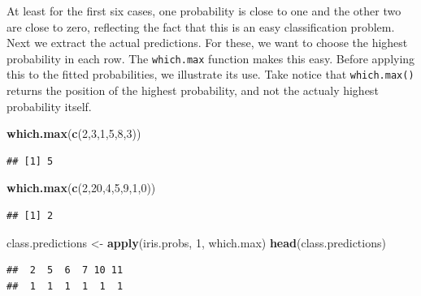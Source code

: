 \documentclass[
]{krantz}
\newenvironment{Shaded}{\begin{snugshade}}{\end{snugshade}}
\newcommand{\DecValTok}[1]{\textcolor[rgb]{0.00,0.00,0.81}{#1}}
\newcommand{\KeywordTok}[1]{\textcolor[rgb]{0.13,0.29,0.53}{\textbf{#1}}}
\newcommand{\NormalTok}[1]{#1}
\newcommand{\StringTok}[1]{\textcolor[rgb]{0.31,0.60,0.02}{#1}}
\begin{document}
At least for the first six cases, one probability is close to one and the other two are close to zero, reflecting the fact that this is an easy classification problem. Next we extract the actual predictions. For these, we want to choose the highest probability in each row. The \texttt{which.max} function makes this easy. Before applying this to the fitted probabilities, we illustrate its use. Take notice that \texttt{which.max()} returns the position of the highest probability, and not the actualy highest probability itself.

\begin{Shaded}
\begin{Highlighting}[]
\KeywordTok{which.max}\NormalTok{(}\KeywordTok{c}\NormalTok{(}\DecValTok{2}\NormalTok{,}\DecValTok{3}\NormalTok{,}\DecValTok{1}\NormalTok{,}\DecValTok{5}\NormalTok{,}\DecValTok{8}\NormalTok{,}\DecValTok{3}\NormalTok{))}
\end{Highlighting}
\end{Shaded}

\begin{verbatim}
## [1] 5
\end{verbatim}

\begin{Shaded}
\begin{Highlighting}[]
\KeywordTok{which.max}\NormalTok{(}\KeywordTok{c}\NormalTok{(}\DecValTok{2}\NormalTok{,}\DecValTok{20}\NormalTok{,}\DecValTok{4}\NormalTok{,}\DecValTok{5}\NormalTok{,}\DecValTok{9}\NormalTok{,}\DecValTok{1}\NormalTok{,}\DecValTok{0}\NormalTok{))}
\end{Highlighting}
\end{Shaded}

\begin{verbatim}
## [1] 2
\end{verbatim}

\begin{Shaded}
\begin{Highlighting}[]
\NormalTok{class.predictions \textless{}{-}}\StringTok{ }\KeywordTok{apply}\NormalTok{(iris.probs, }\DecValTok{1}\NormalTok{, which.max)}
\KeywordTok{head}\NormalTok{(class.predictions)}
\end{Highlighting}
\end{Shaded}

\begin{verbatim}
##  2  5  6  7 10 11 
##  1  1  1  1  1  1
\end{verbatim}
\end{document}
